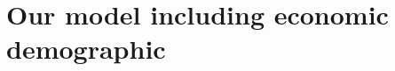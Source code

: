 \documentclass{article}
\begin{document}
%
%
%
%
%


\section{Our model including economic demographic}
\end{document}
